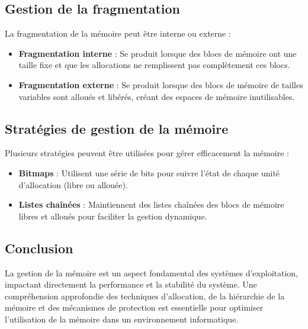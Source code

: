 \subsection{Gestion de la fragmentation}
La fragmentation de la mémoire peut être interne ou externe :
\begin{itemize}
    \item \textbf{Fragmentation interne} : Se produit lorsque des blocs de mémoire ont une taille fixe et que les allocations ne remplissent pas complètement ces blocs.
    \item \textbf{Fragmentation externe} : Se produit lorsque des blocs de mémoire de tailles variables sont alloués et libérés, créant des espaces de mémoire inutilisables.
\end{itemize}

\subsection{Stratégies de gestion de la mémoire}
Plusieurs stratégies peuvent être utilisées pour gérer efficacement la mémoire :
\begin{itemize}
    \item \textbf{Bitmaps} : Utilisent une série de bits pour suivre l'état de chaque unité d'allocation (libre ou allouée).
    \item \textbf{Listes chaînées} : Maintiennent des listes chaînées des blocs de mémoire libres et alloués pour faciliter la gestion dynamique.
\end{itemize}

\subsection{Conclusion}
La gestion de la mémoire est un aspect fondamental des systèmes d'exploitation, impactant directement la performance et la stabilité du système. 
Une compréhension approfondie des techniques d'allocation, de la hiérarchie de la mémoire et des mécanismes de protection est essentielle pour optimiser l'utilisation de la mémoire dans un environnement informatique.
